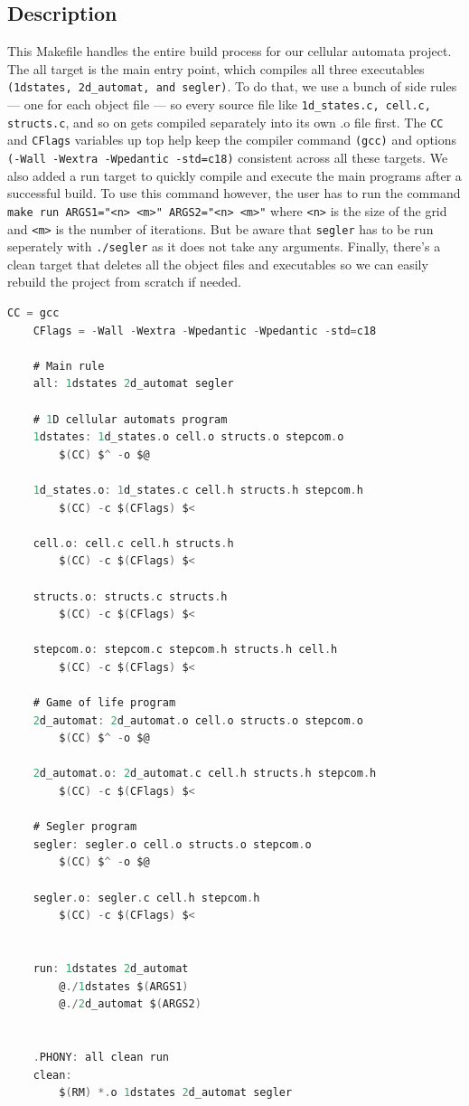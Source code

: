 \documentclass[12pt,a4paper]{article}
\begin{document}
\subsection*{\small Description}
This Makefile handles the entire build process for our cellular automata project. The all target is the main entry 
point, which compiles all three executables \texttt{(1dstates, 2d\_automat, and segler)}. To do that, we use a bunch of side rules 
— one for each object file — so every source file like \texttt{1d\_states.c, cell.c, structs.c}, and so on gets compiled separately 
into its own .o file first. The \texttt{CC} and \texttt{CFlags} variables up top help keep the compiler command \texttt{(gcc)} and options 
\texttt{(-Wall -Wextra -Wpedantic -std=c18)} consistent across all these targets.
\vspace{0.1cm}
We also added a run target to quickly compile and execute the main programs after a successful build. To use this command however, 
the user has to run the command \texttt{make run ARGS1="<n> <m>" ARGS2="<n> <m>"} where \texttt{<n>} is the size of the grid and 
\texttt{<m>} is the number of iterations. But be aware that \texttt{segler} has to be run seperately with \texttt{./segler} as it does not take any arguments.
Finally, there’s a clean target that deletes all the object files and executables so we can easily rebuild the project from scratch if needed.

\vspace{0.5cm}

\begin{lstlisting}[caption={\small Makefile},label={lst:p7001},basicstyle=\ttfamily\tiny,language=C]
    CC = gcc
    CFlags = -Wall -Wextra -Wpedantic -Wpedantic -std=c18

    # Main rule
    all: 1dstates 2d_automat segler

    # 1D cellular automats program
    1dstates: 1d_states.o cell.o structs.o stepcom.o
        $(CC) $^ -o $@

    1d_states.o: 1d_states.c cell.h structs.h stepcom.h
        $(CC) -c $(CFlags) $<

    cell.o: cell.c cell.h structs.h
        $(CC) -c $(CFlags) $<

    structs.o: structs.c structs.h
        $(CC) -c $(CFlags) $<

    stepcom.o: stepcom.c stepcom.h structs.h cell.h
        $(CC) -c $(CFlags) $<

    # Game of life program
    2d_automat: 2d_automat.o cell.o structs.o stepcom.o
        $(CC) $^ -o $@

    2d_automat.o: 2d_automat.c cell.h structs.h stepcom.h
        $(CC) -c $(CFlags) $<

    # Segler program
    segler: segler.o cell.o structs.o stepcom.o
        $(CC) $^ -o $@

    segler.o: segler.c cell.h stepcom.h
        $(CC) -c $(CFlags) $<


    run: 1dstates 2d_automat
        @./1dstates $(ARGS1)
        @./2d_automat $(ARGS2)


    .PHONY: all clean run
    clean:
        $(RM) *.o 1dstates 2d_automat segler
\end{lstlisting}
\end{document}
